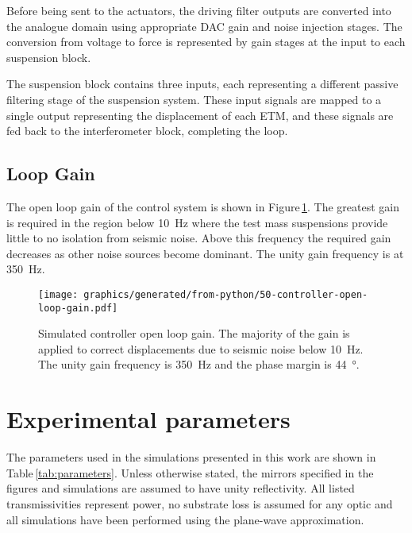 Before being sent to the actuators, the driving filter outputs are converted into the analogue domain using appropriate \gls{DAC} gain and noise injection stages. The conversion from voltage to force is represented by gain stages at the input to each suspension block.

The suspension block contains three inputs, each representing a different passive filtering stage of the suspension system. These input signals are mapped to a single output representing the displacement of each \gls{ETM}, and these signals are fed back to the interferometer block, completing the loop.

\subsection{Loop Gain}

The open loop gain of the control system is shown in Figure\,\ref{fig:open-loop-gain}. The greatest gain is required in the region below \SI{10}{\hertz} where the test mass suspensions provide little to no isolation from seismic noise. Above this frequency the required gain decreases as other noise sources become dominant. The unity gain frequency is at \SI{350}{\hertz}.

\begin{figure}
  \texttt{[image: graphics/generated/from-python/50-controller-open-loop-gain.pdf]}
  \caption[Simulated controller open loop gain]{\label{fig:open-loop-gain}Simulated \SSM{} controller open loop gain. The majority of the gain is applied to correct displacements due to seismic noise below \SI{10}{\hertz}. The unity gain frequency is \SI{350}{\hertz} and the phase margin is \SI{44}{\degree}.}
\end{figure}

\section{\label{app:parameters}Experimental parameters}
The parameters used in the simulations presented in this work are shown in Table\,\ref{tab:parameters}. Unless otherwise stated, the mirrors specified in the figures and simulations are assumed to have unity reflectivity. All listed transmissivities represent power, no substrate loss is assumed for any optic and all simulations have been performed using the plane-wave approximation.

